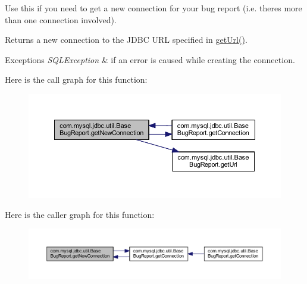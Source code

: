 Use this if you need to get a new connection for your bug report (i.\+e. there\textquotesingle{}s more than one connection involved).

\begin{DoxyReturn}{Returns}
a new connection to the J\+D\+BC U\+RL specified in \mbox{\hyperlink{classcom_1_1mysql_1_1jdbc_1_1util_1_1_base_bug_report_a99f7e2402d349f45c11a4cd09ba4f62a}{get\+Url()}}.
\end{DoxyReturn}

\begin{DoxyExceptions}{Exceptions}
{\em S\+Q\+L\+Exception} & if an error is caused while creating the connection. \\
\hline
\end{DoxyExceptions}
Here is the call graph for this function\+:
\nopagebreak
\begin{figure}[H]
\begin{center}
\leavevmode
\includegraphics[width=350pt]{classcom_1_1mysql_1_1jdbc_1_1util_1_1_base_bug_report_a913aef6f4516678c2d67bba169b32fae_cgraph}
\end{center}
\end{figure}
Here is the caller graph for this function\+:
\nopagebreak
\begin{figure}[H]
\begin{center}
\leavevmode
\includegraphics[width=350pt]{classcom_1_1mysql_1_1jdbc_1_1util_1_1_base_bug_report_a913aef6f4516678c2d67bba169b32fae_icgraph}
\end{center}
\end{figure}
\mbox{\label{classcom_1_1mysql_1_1jdbc_1_1util_1_1_base_bug_report_a99f7e2402d349f45c11a4cd09ba4f62a}} 
